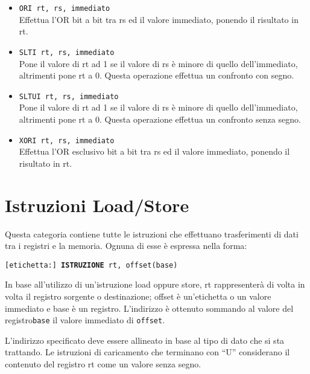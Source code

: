 \documentclass[12pt]{report}
\begin{document}
\begin{itemize}
	\item \texttt{ORI rt, rs, immediato}\\
	Effettua l'OR bit a bit tra rs ed il valore immediato, ponendo il risultato in rt.

	\item \texttt{SLTI rt, rs, immediato}\\
	Pone il valore di rt ad 1 se il valore di rs \`{e} minore di quello dell'immediato, 
	altrimenti pone rt a 0. Questa operazione effettua un confronto con segno.

	\item \texttt{SLTUI rt, rs, immediato}\\
	Pone il valore di rt ad 1 se il valore di rs \`{e} minore di quello dell'immediato, 
	altrimenti pone rt a 0. Questa operazione effettua un confronto senza segno.
	
	\item \texttt{XORI rt, rs, immediato}\\
	Effettua l'OR esclusivo bit a bit tra rs ed il valore immediato, ponendo il risultato in rt.

\end{itemize}

\section{Istruzioni Load/Store}
Questa categoria contiene tutte le istruzioni che effettuano trasferimenti di dati tra i registri 
e la memoria. Ognuna di esse \`{e} espressa nella forma:

\begin{center}
	\texttt{[etichetta:] \textbf{ISTRUZIONE} rt, offset(base)}
\end{center}

In base all'utilizzo di un'istruzione load oppure store, rt rappresenter\`{a} di volta in volta il registro 
sorgente o destinazione; offset \`{e} un'etichetta o un valore immediato e base \`{e} un registro. 
L'indirizzo \`{e} ottenuto sommando al valore del registro\texttt{base} il valore immediato di \texttt{offset}.

L'indirizzo specificato deve essere allineato in base al tipo di dato che si sta trattando. 
Le istruzioni di caricamento che terminano con ``U'' considerano il contenuto del registro rt 
come un valore senza segno.
\end{document}
